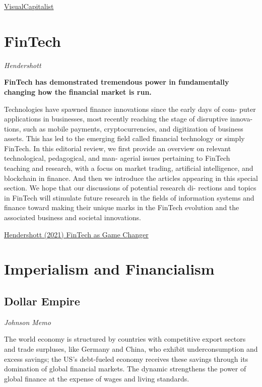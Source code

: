 \documentclass[
]{book}
\begin{document}
\href{https://www.visualcapitalist.com/visualizing-the-sustainable-etf-universe/}{VisualCapitalist}

\hypertarget{fintech}{%
\chapter{FinTech}\label{fintech}}

\emph{Hendershott}

\textbf{FinTech has demonstrated tremendous power in fundamentally changing
how the financial market is run.}

Technologies have spawned finance innovations since the early days of com-
puter applications in businesses, most recently reaching the stage of disruptive innova-
tions, such as mobile payments, cryptocurrencies, and digitization of business assets. This
has led to the emerging field called financial technology or simply FinTech. In this editorial
review, we first provide an overview on relevant technological, pedagogical, and man-
agerial issues pertaining to FinTech teaching and research, with a focus on market trading,
artificial intelligence, and blockchain in finance. And then we introduce the articles
appearing in this special section. We hope that our discussions of potential research di-
rections and topics in FinTech will stimulate future research in the fields of information
systems and finance toward making their unique marks in the FinTech evolution and the
associated business and societal innovations.

\href{pdf/Hendershott_2021_FinTech_as_Game_Changer.pdf}{Hendershott (2021) FinTech as Game Changer}

\hypertarget{imperialism-and-financialism-1}{%
\chapter{Imperialism and Financialism}\label{imperialism-and-financialism-1}}

\hypertarget{dollar-empire}{%
\section{Dollar Empire}\label{dollar-empire}}

\emph{Johnson Memo}

The world economy is structured by countries with competitive export sectors and trade surpluses, like Germany and China, who exhibit underconsumption and excess savings; the US's debt-fueled economy receives these savings through its domination of global financial markets. The dynamic strengthens the power of global finance at the expense of wages and living standards.
\end{document}
